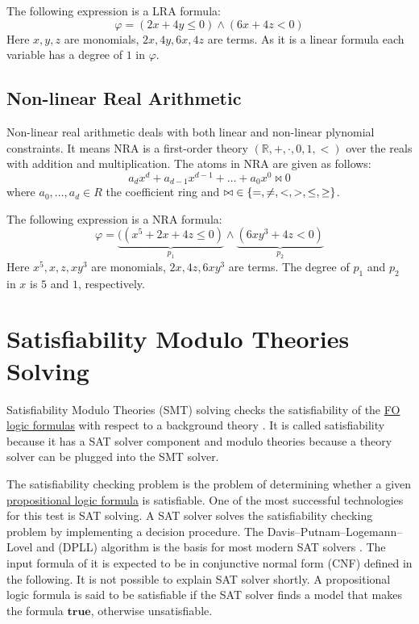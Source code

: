 \begin{example}
    The following expression is a LRA formula:
    $$ \varphi = ( 2x+4y\leq 0 ) \wedge ( 6x+4z< 0 )$$
    Here $x, y, z$ are monomials, $2x, 4y, 6x, 4z$ are terms.
    As it is a linear formula each variable has a degree of $1$ in $\varphi$.
\end{example}
\subsection{Non-linear Real Arithmetic}
\label{subsec:NRA}
Non-linear real arithmetic deals with both linear and non-linear plynomial constraints.
It means NRA is a first-order theory $(\mathbb{R}, +, \cdot, 0, 1, <)$ over the reals with addition and multiplication.
The atoms in NRA are given as follows:
$$ a_{d}x^{d} + a_{d-1}x^{d-1} + \ldots + a_{0}x^{0} \bowtie 0  $$
where $ a_{0}, \ldots, a_{d} \in R $ the coefficient ring and $ \bowtie \hspace{1mm}\in \{=, \neq, <, >, \leq, \geq \} $.\newline

\begin{example}
    The following expression is a NRA formula:
    $$ \varphi = \underbrace{ ( (x^{5}+2x+4z\leq 0 ) }\limits_{p_{1}} \wedge \underbrace{ ( 6xy^{3}+4z< 0 ) }\limits_{p_{2}} $$
    Here $x^{5}, x, z, xy^{3}$ are monomials, $2x, 4z, 6xy^{3}$ are terms.
    The degree of $p_{1}$ and $p_{2}$ in $x$ is $5$ and $1$, respectively.
\end{example}
\section{Satisfiability Modulo Theories Solving}
\label{sec:SMT_Solver}
Satisfiability Modulo Theories (SMT) solving checks the satisfiability of the \hyperref[sec:FOLogic]{FO logic formulas} with respect to a background theory \cite{de2007tutorial}.
It is called satisfiability because it has a SAT solver component and modulo theories because a theory solver can be plugged into the SMT solver.\newline

\noindent The satisfiability checking problem is the problem of determining whether a given \hyperref[sec:PropositionalLogic]{propositional logic formula} is satisfiable.
One of the most successful technologies for this test is SAT solving.
A SAT solver solves the satisfiability checking problem by implementing a decision procedure.
The Davis–Putnam–Logemann–Lovel and (DPLL) algorithm is the basis for most modern SAT solvers \cite{Biere:2009:HSV:1550723}.
The input formula of it is expected to be in conjunctive normal form (CNF) defined in the following.
It is not possible to explain SAT solver shortly.
A propositional logic formula is said to be satisfiable if the SAT solver finds a model that makes the formula $\mathbf{true}$, otherwise unsatisfiable.\newline

